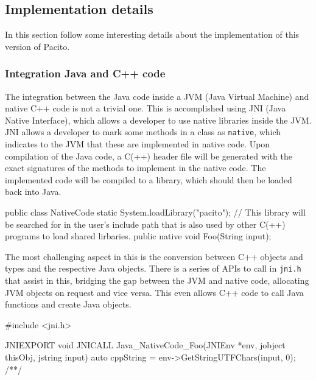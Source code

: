 \subsection{Implementation details}
In this section follow some interesting details about the implementation of this version of Pacito.

\subsubsection{Integration Java and C++ code}
The integration between the Java code inside a JVM (Java Virtual Machine) and native C++ code is not a trivial one. This is accomplished using JNI (Java Native Interface), which allows a developer to use native libraries inside the JVM. JNI allows a developer to mark some methods in a class as {\tt native}, which indicates to the JVM that these are implemented in native code. Upon compilation of the Java code, a C(++) header file will be generated with the exact signatures of the methods to implement in the native code. The implemented code will be compiled to a library, which should then be loaded back into Java.

\begin{javalong}
public class NativeCode {
    static {
        System.loadLibrary("pacito"); // This library will be searched for in the user's include path that is also used by other C(++) programs to load shared lirbaries.
    }
    public native void Foo(String input);
}
\end{javalong}

The most challenging aspect in this is the conversion between C++ objects and types and the respective Java objects. There is a series of APIs to call in {\tt jni.h} that assist in this, bridging the gap between the JVM and native code, allocating JVM objects on request and vice versa. This even allows C++ code to call Java functions and create Java objects.

\begin{cpplong}
#include <jni.h>

JNIEXPORT void JNICALL Java_NativeCode_Foo(JNIEnv *env, jobject thisObj, jstring input) {
    auto cppString = env->GetStringUTFChars(input, 0);
    /**/
}
\end{cpplong}

